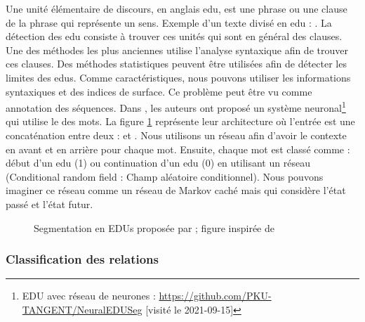 \documentclass{KodeBook}
\begin{document}
Une unité élémentaire de discours, en anglais \ac{edu}, est une phrase ou une clause de la phrase qui représente un sens. 
Exemple d'un texte divisé en \ac{edu} : . 
La détection des \ac{edu} consiste à trouver ces unités qui sont en général des clauses. 
Une des méthodes les plus anciennes utilise l'analyse syntaxique afin de trouver ces clauses. 
Des méthodes statistiques peuvent être utilisées afin de détecter les limites des \ac{edu}s. 
Comme caractéristiques, nous pouvons utiliser les informations syntaxiques et des indices de surface. 
Ce problème peut être vu comme annotation des séquences. 
Dans \cite{2018-wang-al}, les auteurs ont proposé un système neuronal\footnote{EDU avec réseau de neurones : \url{https://github.com/PKU-TANGENT/NeuralEDUSeg} [visité le 2021-09-15]} qui utilise le  des mots. 
La figure \ref{fig:edu-embedding} représente leur architecture où l'entrée est une concaténation entre deux  :  et . 
Nous utilisons un réseau  afin d'avoir le contexte en avant et en arrière pour chaque mot. 
Ensuite, chaque mot est classé comme : début d'un \ac{edu} (1) ou continuation d'un \ac{edu} (0) en utilisant un réseau  (Conditional random field : Champ aléatoire conditionnel).
Nous pouvons imaginer ce réseau comme un réseau de Markov caché mais qui considère l'état passé et l'état futur.

\begin{figure}[!ht]
	\centering
	\caption[Segmentation en EDUs par embeddings]{Segmentation en EDUs proposée par \citet{2018-wang-al} ; figure inspirée de \cite{2019-jurafsky-martin}}
	\label{fig:edu-embedding}
\end{figure}

\subsubsection{Classification des relations}
\end{document}

